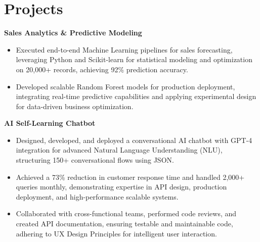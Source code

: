 \documentclass[a4paper,10pt]{article}
\begin{document}
\vspace{-4mm}

\section*{Projects}
\textbf{Sales Analytics \& Predictive Modeling} \\
\begin{itemize}[leftmargin=*, itemsep=0pt, parsep=1pt]
\vspace{-7mm}
    \item Executed end-to-end Machine Learning pipelines for sales forecasting, leveraging Python and Scikit-learn for statistical modeling and optimization on 20,000+ records, achieving 92\% prediction accuracy.
    \item Developed scalable Random Forest models for production deployment, integrating real-time predictive capabilities and applying experimental design for data-driven business optimization.
    \end{itemize}

\vspace{-2mm}
\textbf{AI Self-Learning Chatbot} \\
\begin{itemize}[leftmargin=*, itemsep=0pt, parsep=1pt]
\vspace{-7mm}
    \item Designed, developed, and deployed a conversational AI chatbot with GPT-4 integration for advanced Natural Language Understanding (NLU), structuring 150+ conversational flows using JSON.
    \item Achieved a 73\% reduction in customer response time and handled 2,000+ queries monthly, demonstrating expertise in API design, production deployment, and high-performance scalable systems.
    \item Collaborated with cross-functional teams, performed code reviews, and created API documentation, ensuring testable and maintainable code, adhering to UX Design Principles for intelligent user interaction.
\end{itemize}

\vspace{-2mm}
\end{document}
